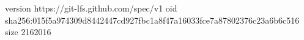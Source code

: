 version https://git-lfs.github.com/spec/v1
oid sha256:015f5a974309d8442447cd927fbc1a8f47a16033fce7a87802376c23a6b6c516
size 2162016
